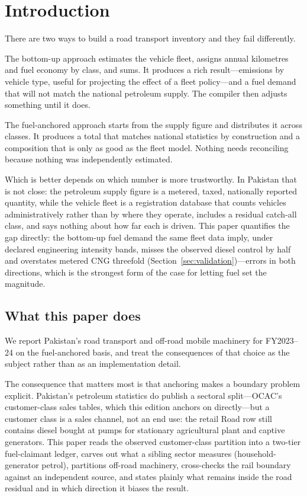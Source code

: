 \section{Introduction}
\label{sec:introduction}

There are two ways to build a road transport inventory and they fail differently.

The bottom-up approach estimates the vehicle fleet, assigns annual kilometres and fuel economy
by class, and sums. It produces a rich result---emissions by vehicle type, useful for
projecting the effect of a fleet policy---and a fuel demand that will not match the national
petroleum supply. The compiler then adjusts something until it does.

The fuel-anchored approach starts from the supply figure and distributes it across classes.
It produces a total that matches national statistics by construction and a composition that is
only as good as the fleet model. Nothing needs reconciling because nothing was independently
estimated.

Which is better depends on which number is more trustworthy. In Pakistan that is not close:
the petroleum supply figure is a metered, taxed, nationally reported quantity, while the
vehicle fleet is a registration database that counts vehicles administratively rather than
by where they operate, includes a residual catch-all class, and says nothing about how far
each is driven. This paper quantifies the gap directly: the bottom-up fuel demand the same
fleet data imply, under declared engineering intensity bands, misses the observed diesel
control by half and overstates metered CNG threefold
(Section~\ref{sec:validation})---errors in both directions, which is the strongest form
of the case for letting fuel set the magnitude.

\subsection{What this paper does}

We report Pakistan's road transport and off-road mobile machinery for FY2023--24 on the
fuel-anchored basis, and treat the consequences of that choice as the subject rather than as
an implementation detail.

The consequence that matters most is that anchoring makes a boundary problem explicit.
Pakistan's petroleum statistics do publish a sectoral split---OCAC's customer-class sales
tables, which this edition anchors on directly---but a customer class is a sales channel,
not an end use: the retail Road row still contains diesel bought at pumps for stationary
agricultural plant and captive generators. This paper reads the observed customer-class
partition into a two-tier fuel-claimant ledger, carves out what a sibling sector measures
(household-generator petrol), partitions off-road machinery, cross-checks the rail
boundary against an independent source, and states plainly what remains inside the road
residual and in which direction it biases the result.


